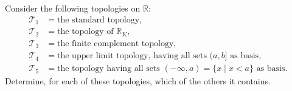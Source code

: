   \begin{exercise}[Munkres 13.7]
    Consider the following topologies on $\mathbb{R}$:
    \begin{align*}
      \mathcal{T}_1 &= \text{the standard topology}, \\
      \mathcal{T}_2 &= \text{the topology of } \mathbb{R}_K, \\
      \mathcal{T}_3 &= \text{the finite complement topology}, \\
      \mathcal{T}_4 &= \text{the upper limit topology, having all sets } (a, b] \text{ as basis}, \\
      \mathcal{T}_5 &= \text{the topology having all sets } (-\infty, a) = \{x \mid x < a\} \text{ as basis}.
    \end{align*}
    Determine, for each of these topologies, which of the others it contains.
  \end{exercise}
